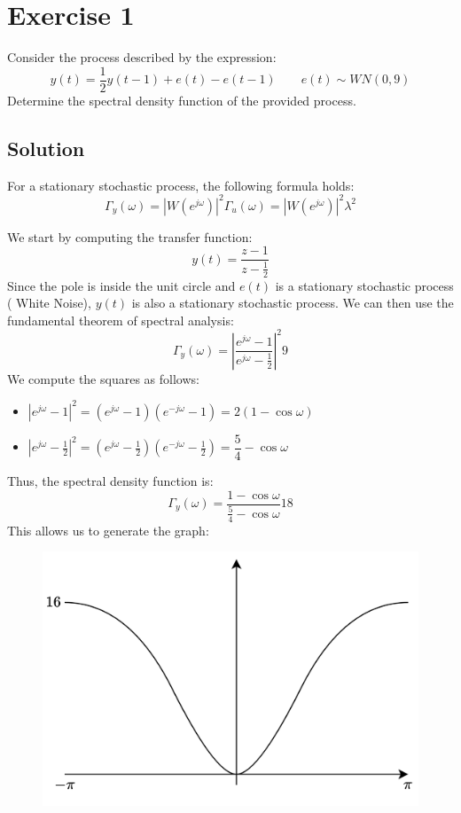 \section{Exercise 1}

Consider the process described by the expression:
\[y(t)=\dfrac{1}{2}y(t-1)+e(t)-e(t-1) \qquad e(t) \sim WN(0,9)\]
Determine the spectral density function of the provided process.

\subsection*{Solution}
For a stationary stochastic process, the following formula holds:
\[\Gamma_y(\omega)=\left\lvert W(e^{j\omega})\right\rvert^2 \Gamma_u(\omega) = \left\lvert W(e^{j\omega})\right\rvert^2 \lambda^2\]

We start by computing the transfer function:
\[y(t)=\dfrac{z-1}{z-\frac{1}{2}}\]
Since the pole is inside the unit circle and $e(t)$ is a stationary stochastic process ( White Noise), $y(t)$ is also a stationary stochastic process.
We can then use the fundamental theorem of spectral analysis:
\[\Gamma_y(\omega) = \left\lvert \dfrac{e^{j\omega}-1}{e^{j\omega}-\frac{1}{2}}\right\rvert^2 9\]
We compute the squares as follows:
\begin{itemize}
    \item $\left\lvert e^{j\omega}-1 \right\rvert^2=\left( e^{j\omega}-1 \right)\left( e^{-j\omega}-1 \right)=2(1-\cos\omega)$
    \item $\left\lvert e^{j\omega}-\frac{1}{2}\right\rvert^2=\left( e^{j\omega}-\frac{1}{2} \right)\left( e^{-j\omega}-\frac{1}{2} \right)=\dfrac{5}{4}-\cos\omega$
\end{itemize}
Thus, the spectral density function is:
\[\Gamma_y(\omega) = \dfrac{1-\cos\omega}{\frac{5}{4}-\cos\omega} 18\]
This allows us to generate the graph:
\begin{figure}[H]
    \centering
    \includegraphics[width=0.4\linewidth]{images/spec.png}
\end{figure}